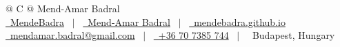 \documentclass[a4paper,11pt]{article}
\begin{document}
\pagestyle{empty} 

\begin{tabularx}{\linewidth}{@{} C @{}}
\Huge{Mend-Amar Badral} \\[7.5pt]
\href{https://github.com/MendeBadra}{\raisebox{-0.05\height}\faGithub\ MendeBadra} \ $|$ \ 
\href{https://www.linkedin.com/in/mend-amar-badral-64217a28a/}{\raisebox{-0.05\height}\faLinkedin\ Mend-Amar Badral} \ $|$ \ 
\href{https://mendebadra.github.io/}{\raisebox{-0.05\height}\faGlobe \ mendebadra.github.io} \\
\href{mailto:mendamar.badral@gmail.com}{\raisebox{-0.05\height}\faEnvelope \ mendamar.badral@gmail.com} \ $|$ \ 
\href{tel:+36 707385744}{\raisebox{-0.05\height}\faMobile \ +36 70 7385 744} \ $|$ \
\faMapMarker \ Budapest, Hungary 
\end{tabularx}





\end{document}
